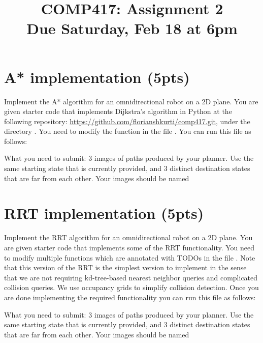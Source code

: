 \documentclass[a4paper,10pt]{article}
\title{COMP417: Assignment 2\\Due Saturday, Feb 18 at 6pm}
\begin{document}
\maketitle

\section{A* implementation (5pts)}
Implement the A* algorithm for an omnidirectional robot on a 2D plane. You are given starter code
that implements Dijkstra's algorithm in Python at the following repository: \url{https://github.com/florianshkurti/comp417.git}, under the directory 
. You need to modify the function  in the file .
You can run this file as follows:

   
  
    

\noindent What you need to submit: 3 images of paths produced by your planner. Use the same starting state that is currently provided, and 
3 distinct destination states that are far from each other. Your images should be named 

\section{RRT implementation (5pts)}
Implement the RRT algorithm for an omnidirectional robot on a 2D plane. You are given starter code
that implements some of the RRT functionality. You need to modify multiple functions which are annotated with TODOs in 
the file . Note that this version of the RRT is the simplest version to implement in the sense that we 
are not requiring kd-tree-based nearest neighbor queries and complicated collision queries. We use occupancy grids to simplify 
collision detection. Once you are done implementing the required functionality you can run this file as follows:

   
 
   

\noindent What you need to submit: 3 images of paths produced by your planner. Use the same starting state that is currently provided, and 
3 distinct destination states that are far from each other. Your images should be named 
\end{document}
